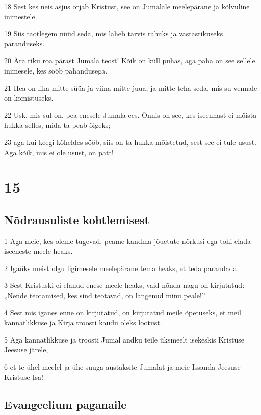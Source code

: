 \par 18 Sest kes neis asjus orjab Kristust, see on Jumalale meelepärane ja kõlvuline inimestele.
\par 19 Siis taotlegem nüüd seda, mis läheb tarvis rahuks ja vastastikuseks paranduseks.
\par 20 Ära riku roa pärast Jumala teost! Kõik on küll puhas, aga paha on see sellele inimesele, kes sööb pahandusega.
\par 21 Hea on liha mitte süüa ja viina mitte juua, ja mitte teha seda, mis su vennale on komistuseks.
\par 22 Usk, mis sul on, pea enesele Jumala ees. Õnnis on see, kes iseennast ei mõista hukka selles, mida ta peab õigeks;
\par 23 aga kui keegi kõheldes sööb, siis on ta hukka mõistetud, sest see ei tule usust. Aga kõik, mis ei ole usust, on patt!



\chapter{15}

\section*{Nõdrausuliste kohtlemisest}

\par 1 Aga meie, kes oleme tugevad, peame kandma jõuetute nõrkusi ega tohi elada iseeneste meele heaks.
\par 2 Igaüks meist olgu ligimesele meelepärane tema heaks, et teda parandada.
\par 3 Sest Kristuski ei elanud enese meele heaks, vaid nõnda nagu on kirjutatud: „Nende teotamised, kes sind teotavad, on langenud minu peale!”
\par 4 Sest mis iganes enne on kirjutatud, on kirjutatud meile õpetuseks, et meil kannatlikkuse ja Kirja troosti kaudu oleks lootust.
\par 5 Aga kannatlikkuse ja troosti Jumal andku teile üksmeelt isekeskis Kristuse Jeesuse järele,
\par 6 et te ühel meelel ja ühe suuga austaksite Jumalat ja meie Issanda Jeesuse Kristuse Isa!

\section*{Evangeelium paganaile}

